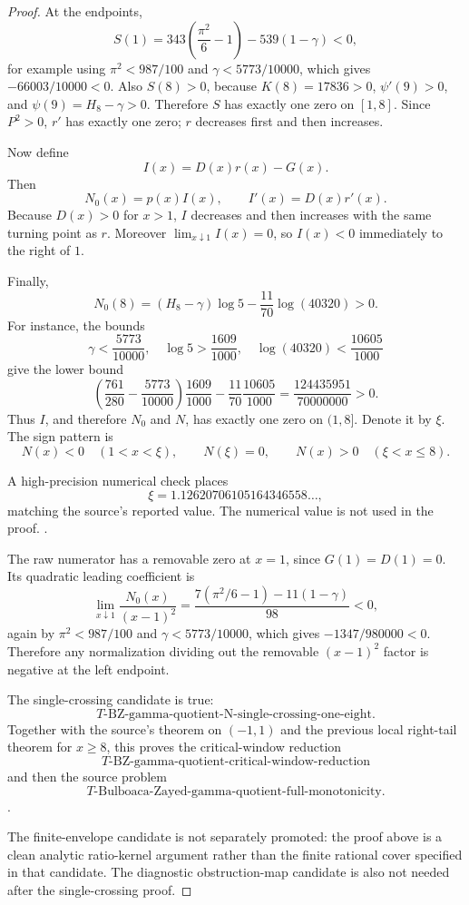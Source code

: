 \begin{proof}
At the endpoints,
\[
S(1)=343\left(\frac{\pi^2}{6}-1\right)-539(1-\gamma)<0,
\]
for example using \(\pi^2<987/100\) and \(\gamma<5773/10000\), which gives
\(-66003/10000<0\).  Also \(S(8)>0\), because \(K(8)=17836>0\),
\(\psi'(9)>0\), and \(\psi(9)=H_8-\gamma>0\).  Therefore \(S\) has exactly
one zero on \([1,8]\).  Since \(P^2>0\), \(r'\) has exactly one zero; \(r\)
decreases first and then increases.

Now define
\[
I(x)=D(x)r(x)-G(x).
\]
Then
\[
N_0(x)=p(x)I(x),\qquad I'(x)=D(x)r'(x).
\]
Because \(D(x)>0\) for \(x>1\), \(I\) decreases and then increases with the
same turning point as \(r\).  Moreover \(\lim_{x\downarrow1}I(x)=0\), so
\(I(x)<0\) immediately to the right of \(1\).

Finally,
\[
N_0(8)=(H_8-\gamma)\log5-\frac{11}{70}\log(40320)>0.
\]
For instance, the bounds
\[
\gamma<\frac{5773}{10000},\quad \log5>\frac{1609}{1000},
\quad \log(40320)<\frac{10605}{1000}
\]
give the lower bound
\[
\left(\frac{761}{280}-\frac{5773}{10000}\right)\frac{1609}{1000}
-\frac{11}{70}\frac{10605}{1000}
=\frac{124435951}{70000000}>0.
\]
Thus \(I\), and therefore \(N_0\) and \(N\), has exactly one zero on
\((1,8]\).  Denote it by \(\xi\).  The sign pattern is
\[
N(x)<0\quad(1<x<\xi),\qquad
N(\xi)=0,\qquad
N(x)>0\quad(\xi<x\le8).
\]

A high-precision numerical check places
\[
\xi=1.12620706105164346558\ldots,
\]
matching the source's reported value.  The numerical value is not used in the
proof. \cite{app-app-0009-source}.

The raw numerator has a removable zero at \(x=1\), since \(G(1)=D(1)=0\).  Its
quadratic leading coefficient is
\[
\lim_{x\downarrow1}\frac{N_0(x)}{(x-1)^2}
=
\frac{7(\pi^2/6-1)-11(1-\gamma)}{98}<0,
\]
again by \(\pi^2<987/100\) and \(\gamma<5773/10000\), which gives
\(-1347/980000<0\).  Therefore any normalization dividing out the removable
\((x-1)^2\) factor is negative at the left endpoint.

The single-crossing candidate is true:
\[
T\text{-BZ-gamma-quotient-N-single-crossing-one-eight}.
\]
Together with the source's theorem on \((-1,1)\) and the previous local
right-tail theorem for \(x\ge8\), this proves the critical-window reduction
\[
T\text{-BZ-gamma-quotient-critical-window-reduction}
\]
and then the source problem
\[
T\text{-Bulboaca-Zayed-gamma-quotient-full-monotonicity}.
\] \cite{app-app-0009-source}.

The finite-envelope candidate is not separately promoted: the proof above is a
clean analytic ratio-kernel argument rather than the finite rational cover
specified in that candidate.  The diagnostic obstruction-map candidate is also
not needed after the single-crossing proof.
\end{proof}

